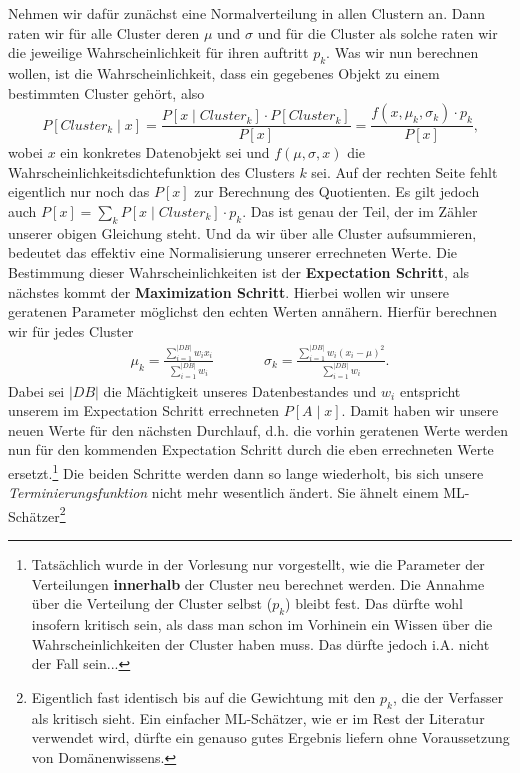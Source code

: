 Nehmen wir dafür zunächst eine Normalverteilung in allen Clustern an. Dann
raten wir für alle Cluster deren \(\mu\) und \(\sigma\) und 
für die Cluster als solche raten wir die jeweilige Wahrscheinlichkeit für
ihren auftritt \(p_k\). Was wir nun berechnen
wollen, ist die Wahrscheinlichkeit, dass ein gegebenes Objekt zu einem
bestimmten Cluster gehört, also
\[
P[Cluster_k \mid x] = \frac{P[x \mid Cluster_k] \cdot P[Cluster_k]}{P[x]}
=\frac{f(x, \mu_k,\sigma_k) \cdot p_k}{P[x]}\text{,}
\]
wobei \(x\) ein konkretes Datenobjekt sei und \(f(\mu,\sigma,x)\) die
Wahrscheinlichkeitsdichtefunktion des Clusters \(k\) sei. Auf der rechten Seite
fehlt eigentlich nur noch das \(P[x]\) zur Berechnung des Quotienten. Es gilt
jedoch auch \(P[x] = \sum_k P[x \mid Cluster_k] \cdot p_k\). Das ist genau der
Teil, der im Zähler unserer obigen Gleichung steht. Und da wir über alle Cluster
aufsummieren, bedeutet das effektiv eine Normalisierung unserer errechneten
Werte. Die Bestimmung dieser Wahrscheinlichkeiten ist der \textbf{Expectation
Schritt}, als nächstes kommt der \textbf{Maximization Schritt}. Hierbei wollen
wir unsere geratenen Parameter möglichst den echten Werten annähern. Hierfür
berechnen wir für jedes Cluster
\begin{align*}
\mu_k = \frac{\sum_{i=1}^{|DB|}w_i x_i}{\sum_{i=1}^{|DB|} w_i} &\qquad &
\sigma_k = \frac{\sum_{i=1}^{|DB|} w_i(x_i - \mu)^2}{\sum_{i=1}^{|DB|} w_i}.
\end{align*}
Dabei sei \(|DB|\) die Mächtigkeit unseres Datenbestandes und \(w_i\) entspricht
unserem im Expectation Schritt errechneten \(P[A \mid x]\). Damit haben wir
unsere neuen Werte für den nächsten Durchlauf, d.h. die vorhin geratenen
Werte werden nun für den kommenden Expectation Schritt durch die eben
errechneten Werte ersetzt.\footnote{Tatsächlich wurde in der Vorlesung
nur vorgestellt, wie die Parameter der Verteilungen \textbf{innerhalb} der Cluster
neu berechnet werden. Die Annahme über die Verteilung der Cluster selbst
(\(p_k\)) bleibt fest. Das dürfte wohl insofern kritisch sein, als dass man
schon im Vorhinein ein Wissen über die Wahrscheinlichkeiten der Cluster haben
muss. Das dürfte jedoch i.A. nicht der Fall sein...}
Die beiden Schritte werden dann so lange wiederholt, bis sich unsere
\textit{Terminierungsfunktion} nicht mehr wesentlich ändert. Sie ähnelt einem
ML-Schätzer\footnote{Eigentlich fast identisch bis auf die Gewichtung mit den
\(p_k\), die der Verfasser als kritisch sieht. Ein einfacher ML-Schätzer, wie er
im Rest der Literatur verwendet wird, dürfte ein genauso gutes Ergebnis liefern 
ohne Voraussetzung von Domänenwissens.}
